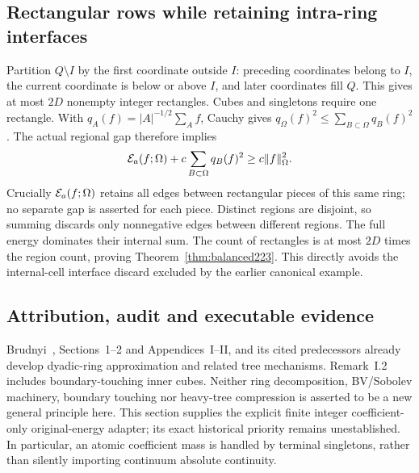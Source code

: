 \subsection{Rectangular rows while retaining intra-ring interfaces}
Partition $Q\setminus I$ by the first coordinate outside $I$: preceding
coordinates belong to $I$, the current coordinate is below or above $I$,
and later coordinates fill $Q$. This gives at most $2D$ nonempty integer
rectangles. Cubes and singletons require one rectangle. With
$q_A(f)=|A|^{-1/2}\sum_A f$, Cauchy gives
$q_\Omega(f)^2\le\sum_{B\subset\Omega}q_B(f)^2$.
The actual regional gap therefore implies
\[
 \mathcal E_a(f;\Omega)+c\sum_{B\subset\Omega}q_B(f)^2\ge c\|f\|_\Omega^2.
\]
Crucially $\mathcal E_a(f;\Omega)$ retains all edges between rectangular pieces
of this same ring; no separate gap is asserted for each piece.
Distinct regions are disjoint, so summing discards only nonnegative edges
between different regions. The full energy dominates their internal sum.
The count of rectangles is at most $2D$ times the region count, proving
Theorem~\ref{thm:balanced223}. This directly avoids the internal-cell
interface discard excluded by the earlier canonical example.

\subsection{Attribution, audit and executable evidence}
Brudnyi~\cite{brudnyi221}, Sections~1--2 and Appendices~I--II, and its cited
predecessors already develop dyadic-ring approximation and related tree
mechanisms. Remark~I.2 includes boundary-touching inner cubes. Neither
ring decomposition, BV/Sobolev machinery, boundary touching nor heavy-tree
compression is asserted to be a new general principle here. This section
supplies the explicit finite integer coefficient-only original-energy
adapter; its exact historical priority remains unestablished. In particular,
an atomic coefficient mass is handled by terminal singletons, rather than
silently importing continuum absolute continuity.

